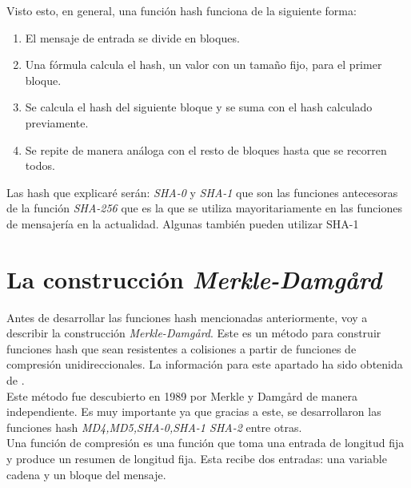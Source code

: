 Visto esto, en general, una función hash funciona de la siguiente forma:
\begin{enumerate}
	\item El mensaje de entrada se divide en bloques.
	\item Una fórmula calcula el hash, un valor con un tamaño fijo, para el primer bloque.
	\item Se calcula el hash del siguiente bloque y se suma con el hash calculado previamente.
	\item Se repite de manera análoga con el resto de bloques hasta que se recorren todos.
\end{enumerate}

Las hash que explicaré serán: \emph{SHA-0} y \emph{SHA-1} que son las funciones antecesoras de la función \emph{SHA-256} que es la que se utiliza mayoritariamente en las funciones de mensajería en la actualidad. Algunas también pueden utilizar SHA-1\\

\section{La construcción \emph{Merkle-Damgård}}
Antes de desarrollar las funciones hash mencionadas anteriormente, voy a describir la construcción \emph{Merkle-Damgård}. Este es un método para construir funciones hash que sean resistentes a colisiones a partir de funciones de compresión unidireccionales. La información para este apartado ha sido obtenida de \cite{Tiwari2017}.\\
Este método fue descubierto en 1989 por Merkle y Damgård de manera independiente. Es muy importante ya que gracias a este, se desarrollaron las funciones hash \emph{MD4,\:MD5,\:SHA-0,\:SHA-1 SHA-2} entre otras.\\
Una función de compresión es una función que toma una entrada de longitud fija y produce un resumen de longitud fija. Esta recibe dos entradas: una variable cadena y un bloque del mensaje.\\

